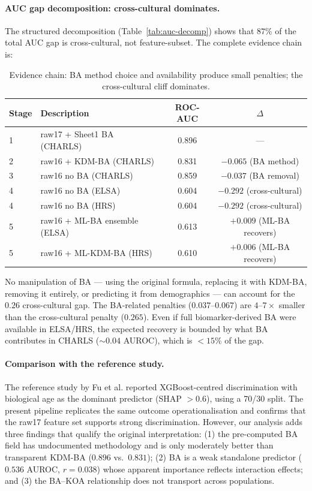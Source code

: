 \documentclass[11pt,a4paper]{article}
\begin{document}
\paragraph{AUC gap decomposition: cross-cultural dominates.}
The structured decomposition (Table~\ref{tab:auc-decomp}) shows that $87\%$ of the
total AUC gap is cross-cultural, not feature-subset. The complete evidence chain is:

\begin{table}[h!]
\centering
\small
\caption{Evidence chain: BA method choice and availability produce small penalties;
the cross-cultural cliff dominates.}
\label{tab:chain}
\begin{tabular}{llcc}
\toprule
Stage & Description & ROC-AUC & $\Delta$ \\
\midrule
1 & raw17 + Sheet1 BA (CHARLS)      & 0.896 & --- \\
2 & raw16 + KDM-BA (CHARLS)         & 0.831 & $-0.065$ (BA method) \\
3 & raw16 no BA (CHARLS)           & 0.859 & $-0.037$ (BA removal) \\
4 & raw16 no BA (ELSA)             & 0.604 & $-0.292$ (cross-cultural) \\
4 & raw16 no BA (HRS)              & 0.604 & $-0.292$ (cross-cultural) \\
5 & raw16 + ML-BA ensemble (ELSA)  & 0.613 & $+0.009$ (ML-BA recovers) \\
5 & raw16 + ML-KDM-BA (HRS)        & 0.610 & $+0.006$ (ML-BA recovers) \\
\bottomrule
\end{tabular}
\end{table}

No manipulation of BA --- using the original formula, replacing it with KDM-BA,
removing it entirely, or predicting it from demographics --- can account for the
$0.26$ cross-cultural gap. The BA-related penalties ($0.037$--$0.067$) are
$4$--$7\times$ smaller than the cross-cultural penalty ($0.265$). Even if full
biomarker-derived BA were available in ELSA/HRS, the expected recovery is bounded
by what BA contributes in CHARLS ($\sim 0.04$ AUROC), which is $<15\%$ of the gap.

\paragraph{Comparison with the reference study.}
The reference study by Fu et al.\cite{Fu2025} reported XGBoost-centred discrimination with
biological age as the dominant predictor (SHAP $> 0.6$), using a 70/30 split. The present
pipeline replicates the same outcome operationalisation and confirms that the raw17 feature
set supports strong discrimination. However, our analysis adds three findings that qualify
the original interpretation: (1) the pre-computed BA field has undocumented methodology
and is only moderately better than transparent KDM-BA ($0.896$ vs.\ $0.831$);
(2) BA is a weak standalone predictor ($0.536$ AUROC, $r=0.038$) whose apparent importance
reflects interaction effects; and (3) the BA--KOA relationship does not transport across
populations.
\end{document}
